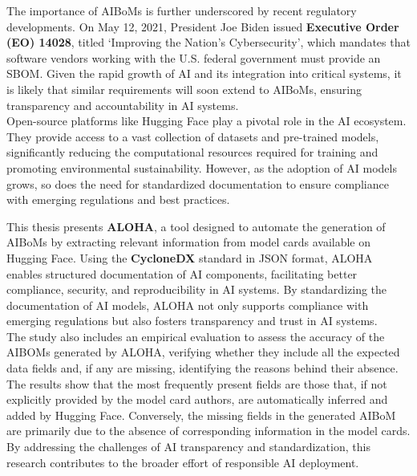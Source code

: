\documentclass[12pt,a4paper, oneside, openright]{book}
\newcommand{\aibom}{{AIBoM}\xspace}
\newcommand{\aiboms}{{AIBoMs}\xspace}
\begin{document}
The importance of \aiboms is further underscored by recent regulatory developments. On May 12, 2021, President Joe Biden issued \textbf{Executive Order (EO) 14028}, titled `Improving the Nation’s Cybersecurity', which mandates that software vendors working with the U.S. federal government must provide an SBOM. Given the rapid growth of AI and its integration into critical systems, it is likely that similar requirements will soon extend to AIBoMs, ensuring transparency and accountability in AI systems.\\
Open-source platforms like Hugging Face play a pivotal role in the AI ecosystem. They provide access to a vast collection of datasets and pre-trained models, significantly reducing the computational resources required for training and promoting environmental sustainability. However, as the adoption of AI models grows, so does the need for standardized documentation to ensure compliance with emerging regulations and best practices.

This thesis presents \textbf{ALOHA}, a tool designed to automate the generation of \aiboms by extracting relevant information from model cards available on Hugging Face. Using the \textbf{CycloneDX} standard in JSON format, ALOHA enables structured documentation of AI components, facilitating better compliance, security, and reproducibility in AI systems. By standardizing the documentation of AI models, ALOHA not only supports compliance with emerging regulations but also fosters transparency and trust in AI systems.\\
The study also includes an empirical evaluation to assess the accuracy of the AIBOMs generated by ALOHA, verifying whether they include all the expected data fields and, if any are missing, identifying the reasons behind their absence. The results show that the most frequently present fields are those that, if not explicitly provided by the model card authors, are automatically inferred and added by Hugging Face. Conversely, the missing fields in the generated \aibom are primarily due to the absence of corresponding information in the model cards.
By addressing the challenges of AI transparency and standardization, this research contributes to the broader effort of responsible AI deployment.
\end{document}
